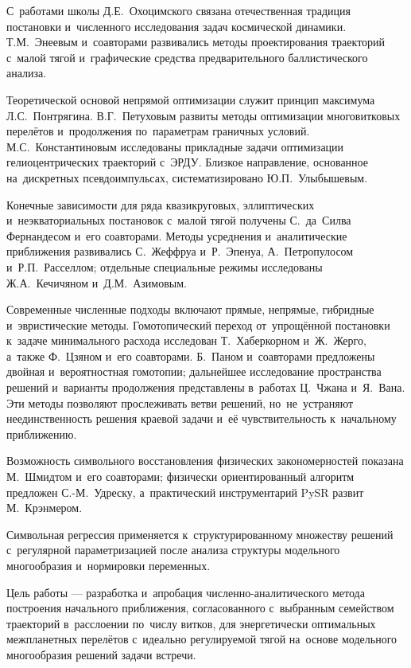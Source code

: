 С~работами школы Д.Е.~Охоцимского связана отечественная традиция постановки и~численного исследования задач космической динамики. Т.М.~Энеевым и~соавторами развивались методы проектирования траекторий с~малой тягой и~графические средства предварительного баллистического анализа.

Теоретической основой непрямой оптимизации служит принцип максимума Л.С.~Понтрягина. В.Г.~Петуховым развиты методы оптимизации многовитковых перелётов и~продолжения по~параметрам граничных условий. М.С.~Константиновым исследованы прикладные задачи оптимизации гелиоцентрических траекторий с~ЭРДУ. Близкое направление, основанное на~дискретных псевдоимпульсах, систематизировано Ю.П.~Улыбышевым.

Конечные зависимости для ряда квазикруговых, эллиптических и~неэкваториальных постановок с~малой тягой получены С.~да~Силва Фернандесом и~его соавторами. Методы усреднения и~аналитические приближения развивались С.~Жеффруа и~Р.~Эпенуа, А.~Петропулосом и~Р.П.~Расселлом; отдельные специальные режимы исследованы Ж.А.~Кечичяном и~Д.М.~Азимовым.

Современные численные подходы включают прямые, непрямые, гибридные и~эвристические методы. Гомотопический переход от~упрощённой постановки к~задаче минимального расхода исследован Т.~Хаберкорном и~Ж.~Жерго, а~также Ф.~Цзяном и~его соавторами. Б.~Паном и~соавторами предложены двойная и~вероятностная гомотопии; дальнейшее исследование пространства решений и~варианты продолжения представлены в~работах Ц.~Чжана и~Я.~Вана. Эти методы позволяют прослеживать ветви решений, но~не~устраняют неединственность решения краевой задачи и~её чувствительность к~начальному приближению.

Возможность символьного восстановления физических закономерностей показана М.~Шмидтом и~его соавторами; физически ориентированный алгоритм предложен С.-М.~Удреску, а~практический инструментарий PySR развит М.~Крэнмером.

Символьная регрессия применяется к~структурированному множеству решений с~регулярной параметризацией после анализа структуры модельного многообразия и~нормировки переменных.

Цель работы --- разработка и~апробация численно-аналитического метода построения начального приближения, согласованного с~выбранным семейством траекторий в~расслоении по~числу витков, для энергетически оптимальных межпланетных перелётов с~идеально регулируемой тягой на~основе модельного многообразия решений задачи встречи.


